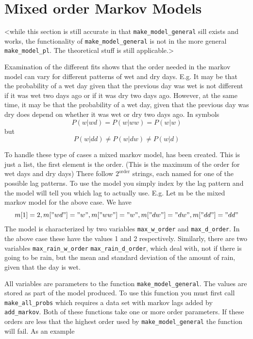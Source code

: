 \documentclass{article}
\begin{document}
\section{Mixed order Markov Models}

<while this section is still accurate in that {\tt make\_model\_general}
sill exists and works, the functionality of {\tt make\_model\_general}
is not in the more general {\tt make\_model\_pl}.  The theoretical
stuff is still applicable.>

Examination of the different fits shows that the order needed in the markov
model can vary for different patterns of wet and dry days.  E.g.  It may
be that the probability of a wet day given that the previous day was wet
is not different if it was wet two days ago or if it was dry two days ago.
However, at the same time, it may be that the probability of a wet day, given
that the previous day was dry does depend on whether it was wet or dry two
days ago.  In symbols
\begin{equation}
P(w|wd)=P(w|ww)=P(w|w)
\end{equation}
but
\begin{equation}
P(w|dd) \neq P(w|dw) \neq P(w|d)
\end{equation}

To handle these type of cases a mixed markov model, has been created.
This is just a list, the first element is the order. (This is the maximum
of the order for wet days and dry days) There
follow $2^{\mbox{order}}$ strings, each named for one of the
possible lag patterns.  To use the model you simply index by the lag
pattern and the model will tell you which lag to actually use.
E.g. Let m be the mixed markov model for the above case.
We have
\begin{equation}
m[1]=2, m["wd"]="w", m["ww"]="w", m["dw"]="dw", m["dd"]="dd"
\end{equation}
The model is characterized by two variables {\tt max\_w\_order} and
{\tt max\_d\_order}.  In the above case these have the values 1 and 2
respectively.  Similarly, there are two variables {\tt max\_rain\_w\_order}
{\tt max\_rain\_d\_order}, which deal with, not if there is going to be rain,
but the mean and standard deviation of the amount of rain, given that
the day is wet.  

All variables are parameters to the function {\tt make\_model\_general}.
The values are stored as part of the model produced.  To use this function
you must first call {\tt make\_all\_probs} which requires a data set with
markov lags added by {\tt add\_markov}.  Both of these functions take
one or more order parameters.  If these orders are less that the highest
order used by {\tt make\_model\_general} the function will fail.
As an example
\end{document}
